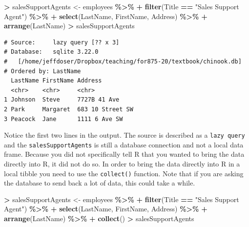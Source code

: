 \documentclass[
]{krantz}
\makeatletter
\newenvironment{Shaded}{\begin{snugshade}}{\end{snugshade}}
\newcommand{\KeywordTok}[1]{\textcolor[rgb]{0.27,0.27,0.27}{\textbf{#1}}}
\newcommand{\NormalTok}[1]{#1}
\newcommand{\OperatorTok}[1]{\textcolor[rgb]{0.43,0.43,0.43}{\textbf{#1}}}
\newcommand{\StringTok}[1]{\textcolor[rgb]{0.5,0.5,0.5}{#1}}
\newenvironment{kframe}{%
\medskip{}
\setlength{\fboxsep}{.8em}
 \def\at@end@of@kframe{}%
 \ifinner\ifhmode%
  \def\at@end@of@kframe{\end{minipage}}%
  \begin{minipage}{\columnwidth}%
 \fi\fi%
 \def\FrameCommand##1{\hskip\@totalleftmargin \hskip-\fboxsep
 \colorbox{shadecolor}{##1}\hskip-\fboxsep
     \hskip-\linewidth \hskip-\@totalleftmargin \hskip\columnwidth}%
 \MakeFramed {\advance\hsize-\width
   \@totalleftmargin\z@ \linewidth\hsize
   \@setminipage}}%
 {\par\unskip\endMakeFramed%
 \at@end@of@kframe}
\renewenvironment{Shaded}{\begin{kframe}}{\end{kframe}}
\makeatother
\begin{document}
\begin{Shaded}
\begin{Highlighting}[]
\OperatorTok{\textgreater{}}\StringTok{ }\NormalTok{salesSupportAgents \textless{}{-}}\StringTok{ }\NormalTok{employees }\OperatorTok{\%\textgreater{}\%}\StringTok{ }
\OperatorTok{+}\StringTok{   }\KeywordTok{filter}\NormalTok{(Title }\OperatorTok{==}\StringTok{ "Sales Support Agent"}\NormalTok{) }\OperatorTok{\%\textgreater{}\%}\StringTok{ }
\OperatorTok{+}\StringTok{   }\KeywordTok{select}\NormalTok{(LastName, FirstName, Address) }\OperatorTok{\%\textgreater{}\%}\StringTok{ }
\OperatorTok{+}\StringTok{   }\KeywordTok{arrange}\NormalTok{(LastName) }
\OperatorTok{\textgreater{}}\StringTok{ }\NormalTok{salesSupportAgents}
\end{Highlighting}
\end{Shaded}

\begin{verbatim}
# Source:     lazy query [?? x 3]
# Database:   sqlite 3.22.0
#   [/home/jeffdoser/Dropbox/teaching/for875-20/textbook/chinook.db]
# Ordered by: LastName
  LastName FirstName Address         
  <chr>    <chr>     <chr>           
1 Johnson  Steve     7727B 41 Ave    
2 Park     Margaret  683 10 Street SW
3 Peacock  Jane      1111 6 Ave SW   
\end{verbatim}

Notice the first two lines in the output. The source is described as a \texttt{lazy\ query} and the \texttt{salesSupportAgents} is still a database connection and not a local data frame. Because you did not specifically tell R that you wanted to bring the data directly into R, it did not do so. In order to bring the data directly into R in a local tibble you need to use the \texttt{collect()} function. Note that if you are asking the database to send back a lot of data, this could take a while.

\begin{Shaded}
\begin{Highlighting}[]
\OperatorTok{\textgreater{}}\StringTok{ }\NormalTok{salesSupportAgents \textless{}{-}}\StringTok{ }\NormalTok{employees }\OperatorTok{\%\textgreater{}\%}\StringTok{ }
\OperatorTok{+}\StringTok{   }\KeywordTok{filter}\NormalTok{(Title }\OperatorTok{==}\StringTok{ "Sales Support Agent"}\NormalTok{) }\OperatorTok{\%\textgreater{}\%}\StringTok{ }
\OperatorTok{+}\StringTok{   }\KeywordTok{select}\NormalTok{(LastName, FirstName, Address) }\OperatorTok{\%\textgreater{}\%}\StringTok{ }
\OperatorTok{+}\StringTok{   }\KeywordTok{arrange}\NormalTok{(LastName) }\OperatorTok{\%\textgreater{}\%}\StringTok{ }
\OperatorTok{+}\StringTok{   }\KeywordTok{collect}\NormalTok{()}
\OperatorTok{\textgreater{}}\StringTok{ }\NormalTok{salesSupportAgents}
\end{Highlighting}
\end{Shaded}
\end{document}
